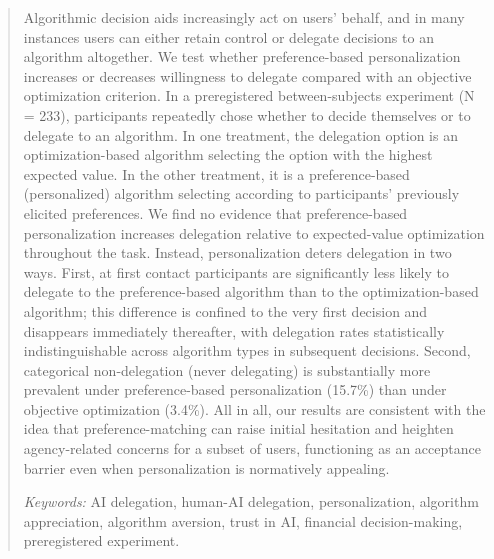 \documentclass[a4paper, 12pt, fleqn]{article}
\theoremstyle{definition}
\begin{document}
\begin{abstract}
  Algorithmic decision aids increasingly act on users’ behalf, and in many instances users can either retain control or delegate decisions to an algorithm altogether. We test whether preference-based personalization increases or decreases willingness to delegate compared with an objective optimization criterion. In a preregistered between-subjects experiment (N = 233), participants repeatedly chose whether to decide themselves or to delegate to an algorithm. In one treatment, the delegation option is an optimization-based algorithm selecting the option with the highest expected value. In the other treatment, it is a preference-based (personalized) algorithm selecting according to participants’ previously elicited preferences. We find no evidence that preference-based personalization increases delegation relative to expected-value optimization throughout the task. Instead, personalization deters delegation in two ways. First, at first contact participants are significantly less likely to delegate to the preference-based algorithm than to the optimization-based algorithm; this difference is confined to the very first decision and disappears immediately thereafter, with delegation rates statistically indistinguishable across algorithm types in subsequent decisions. Second, categorical non-delegation (never delegating) is substantially more prevalent under preference-based personalization (15.7\%) than under objective optimization (3.4\%). 
  All in all, our results are consistent with the idea that preference-matching can raise initial hesitation and heighten agency-related concerns for a subset of users, functioning as an acceptance barrier even when personalization is normatively appealing.
  
     \vspace{.25cm}
  \textit{Keywords:} {AI delegation, human-AI delegation, personalization, algorithm appreciation, algorithm aversion, trust in AI, financial decision-making, preregistered experiment.}\vspace{.15cm}
\end{abstract}
\vspace{-.5cm}
\end{document}
